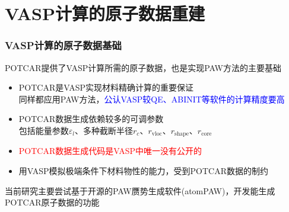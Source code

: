 %
\section{\rm{VASP}计算的原子数据重建}
\frame
{
	\frametitle{\textrm{VASP}计算的原子数据基础}
	\textrm{POTCAR}提供了\textrm{VASP}计算所需的原子数据，也是实现\textrm{PAW}方法的主要基础
	\begin{itemize}
		\item \textrm{POTCAR}是\textrm{VASP}实现材料精确计算的重要保证\\
			同样都应用\textrm{PAW}方法，\textcolor{blue}{公认\textrm{VASP}较\textrm{QE}、\textrm{ABINIT}等软件的计算精度要高}
		\item \textrm{POTCAR}数据生成依赖较多的可调参数\\
			包括能量参数$\varepsilon_l$、多种截断半径$r_c$、$r_{\mathrm{vloc}}$、$r_{\mathrm{shape}}$、$r_{\mathrm{core}}$
		\item \textcolor{red}{\textrm{POTCAR}数据生成代码是\textrm{VASP}中唯一没有公开的}
		\item 用\textrm{VASP}模拟极端条件下材料物性的能力，受到\textrm{POTCAR}数据的制约
	\end{itemize}

当前研究主要尝试基于开源的\textrm{PAW}赝势生成软件(\textrm{atomPAW})，开发能生成\textrm{POTCAR}原子数据的功能
}

